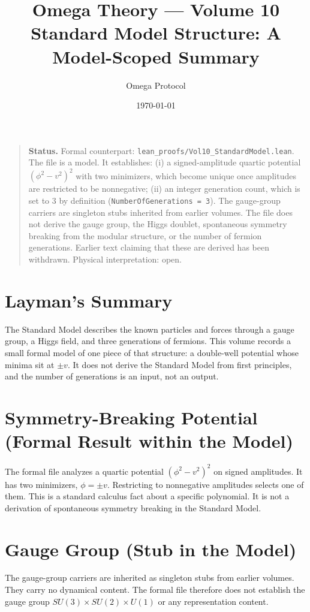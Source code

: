 \documentclass[11pt, a4paper]{article}
\title{Omega Theory --- Volume 10\\\Large Standard Model Structure: A Model-Scoped Summary}
\author{Omega Protocol}
\date{\today}
\begin{document}
\maketitle

\begin{quote}
\textbf{Status.} Formal counterpart: \texttt{lean\_proofs/Vol10\_StandardModel.lean}. The file is a model. It establishes: (i) a signed-amplitude quartic potential $(\phi^2 - v^2)^2$ with two minimizers, which become unique once amplitudes are restricted to be nonnegative; (ii) an integer generation count, which is set to $3$ by definition (\texttt{NumberOfGenerations = 3}). The gauge-group carriers are singleton stubs inherited from earlier volumes. The file does not derive the gauge group, the Higgs doublet, spontaneous symmetry breaking from the modular structure, or the number of fermion generations. Earlier text claiming that these are derived has been withdrawn. Physical interpretation: open.
\end{quote}

\section*{Layman's Summary}
The Standard Model describes the known particles and forces through a gauge group, a Higgs field, and three generations of fermions. This volume records a small formal model of one piece of that structure: a double-well potential whose minima sit at $\pm v$. It does not derive the Standard Model from first principles, and the number of generations is an input, not an output.

\section{Symmetry-Breaking Potential (Formal Result within the Model)}
The formal file analyzes a quartic potential $(\phi^2 - v^2)^2$ on signed amplitudes. It has two minimizers, $\phi = \pm v$. Restricting to nonnegative amplitudes selects one of them. This is a standard calculus fact about a specific polynomial. It is not a derivation of spontaneous symmetry breaking in the Standard Model.

\section{Gauge Group (Stub in the Model)}
The gauge-group carriers are inherited as singleton stubs from earlier volumes. They carry no dynamical content. The formal file therefore does not establish the gauge group $SU(3)\times SU(2)\times U(1)$ or any representation content.
\end{document}
